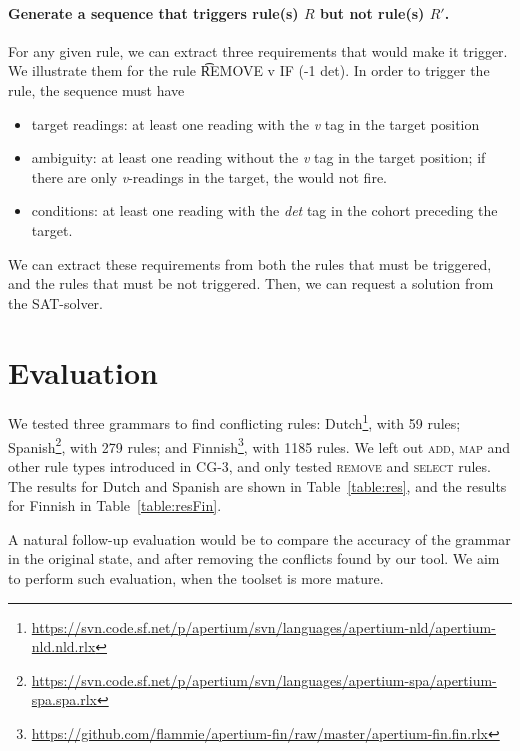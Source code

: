 {{\paragraph{Generate a sequence that triggers rule(s) $R$ but not rule(s) $R'$.}
For any given rule, we can extract three requirements that would make it trigger. We illustrate them for the rule \t{REMOVE v IF (-1 det)}. In order to trigger the rule, the sequence must have
\begin{itemize}
\item target readings: at least one reading with the \emph{v} tag in the target position
\item ambiguity: at least one reading without the \emph{v} tag in the target position; if there are only \emph{v}-readings in the target, the would not fire.
\item conditions: at least one reading with the \emph{det} tag in the cohort preceding the target.
\end{itemize}

We can extract these requirements from both the rules that must be triggered, and the rules that must be not triggered. Then, we can request a solution from the SAT-solver.

\section{Evaluation}
\label{sec:eval}

We tested three grammars to find conflicting rules: 
Dutch\footnote{\scriptsize{\url{https://svn.code.sf.net/p/apertium/svn/languages/apertium-nld/apertium-nld.nld.rlx}}},
with 59 rules; 
Spanish\footnote{\scriptsize{\url{https://svn.code.sf.net/p/apertium/svn/languages/apertium-spa/apertium-spa.spa.rlx}}},
with 279 rules; and 
Finnish\footnote{\scriptsize{\url{https://github.com/flammie/apertium-fin/raw/master/apertium-fin.fin.rlx}}},
with 1185 rules. We left out \textsc{add}, \textsc{map} and other rule
types introduced in CG-3, and only tested \textsc{remove} and \textsc{select} rules.
The results for Dutch and Spanish are shown in Table~\ref{table:res},
and the results for Finnish in Table~\ref{table:resFin}.

A natural follow-up evaluation would be to compare the accuracy of the
grammar in the original state, and after removing the conflicts found
by our tool. We aim to perform such evaluation, when the toolset is more mature.




}}
